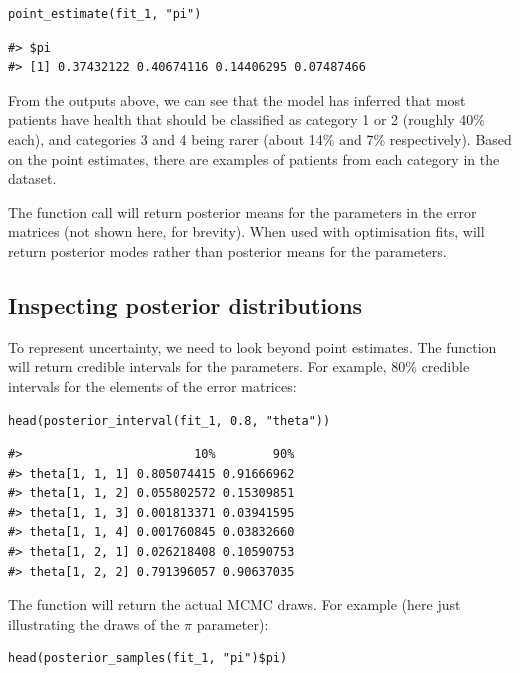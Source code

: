 \begin{verbatim}
point_estimate(fit_1, "pi")
\end{verbatim}

\begin{verbatim}
#> $pi
#> [1] 0.37432122 0.40674116 0.14406295 0.07487466
\end{verbatim}

From the outputs above, we can see that the model has inferred that most
patients have health that should be classified as category 1 or 2 (roughly 40\%
each), and categories 3 and 4 being rarer (about 14\% and 7\% respectively).
Based on the point estimates, there are examples of patients from each category
in the dataset.

The function call  will return posterior
means for the parameters in the error matrices (not shown here, for brevity).
When used with optimisation fits,  will return
posterior modes rather than posterior means for the parameters.

\hypertarget{inspecting-posterior-distributions}{%
\subsection{Inspecting posterior distributions}\label{inspecting-posterior-distributions}}

To represent uncertainty, we need to look beyond point estimates. The function
 will return credible intervals for the parameters.
For example, 80\% credible intervals for the elements of the error matrices:

\begin{verbatim}
head(posterior_interval(fit_1, 0.8, "theta"))
\end{verbatim}

\begin{verbatim}
#>                        10%        90%
#> theta[1, 1, 1] 0.805074415 0.91666962
#> theta[1, 1, 2] 0.055802572 0.15309851
#> theta[1, 1, 3] 0.001813371 0.03941595
#> theta[1, 1, 4] 0.001760845 0.03832660
#> theta[1, 2, 1] 0.026218408 0.10590753
#> theta[1, 2, 2] 0.791396057 0.90637035
\end{verbatim}

The function  will return the actual MCMC draws. For
example (here just illustrating the draws of the \(\pi\) parameter):

\begin{verbatim}
head(posterior_samples(fit_1, "pi")$pi)
\end{verbatim}

